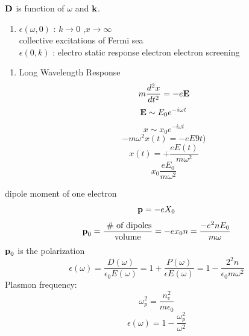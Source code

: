 \documentclass[english, 11pt]{article}
\begin{document}
		$\textrm{\textbf{D}}$ is function of $\omega$ and $\textrm{\textbf{k}}$.  
		
		\begin{enumerate}[A]
			\item $\epsilon (\omega,0)$ : $k \rightarrow 0$ ,$x \rightarrow \infty$\\
					collective excitations of Fermi sea\\
				 $\epsilon (0,k)$ : electro static response electron electron screening\\
		\end{enumerate}
		\begin{enumerate}[A]
			\item Long Wavelength Response\\
		\begin{equation}
			m\frac{d^2x}{dt^2} = -e\textrm{\textbf{E}}
		\end{equation}
		\begin{equation}
			\textrm{\textbf{E}}\sim E_0 e^{-i\omega t}
		\end{equation}
				\begin{equation}
			x \sim x_0 e^{-i\omega t}
		\end{equation}
				\begin{equation}
			-m\omega^2 x(t) = -e E9t)
		\end{equation}
				\begin{equation}
			x(t) = + \frac{eE(t)}{m\omega^2}
		\end{equation}
				\begin{equation}
			x_0 \frac{eE_0}{m\omega^2}
		\end{equation}
		\end{enumerate}
		dipole moment of one electron
		\begin{equation}
			\textrm{\textbf{p}} = -e X_0
		\end{equation}
		\begin{equation}
			\textrm{\textbf{p}}_0 = \frac{\text{ \# of dipoles}}{\text{volume}} = -e x_0 n = \frac{-e^2 n E_0}{m\omega}
		\end{equation}
		$\textrm{\textbf{p}}_0$ is the polarization
						\begin{equation}
			\epsilon(\omega) = \frac{D(\omega)}{\epsilon_0 E(\omega)}= 1 + \frac{P(\omega)}{\epsilon E(\omega)} = 1 - \frac{2^2n}{\epsilon_0 m \omega^2}
		\end{equation}
		Plasmon frequency:
						\begin{equation}
			\omega_p^2 = \frac{n_e^2}{m\epsilon_0}
		\end{equation}
						\begin{equation}
			\epsilon(\omega) = 1 - \frac{\omega_p^2}{\omega^2}
		\end{equation}
\end{document}
